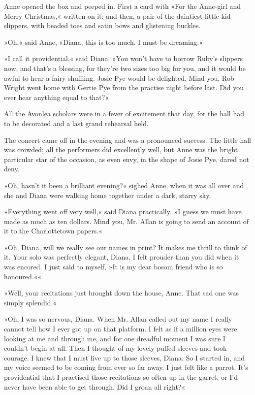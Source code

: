 Anne opened the box and peeped in. First a card with »For the Anne-girl and Merry Christmas,« written on it; and then, a pair of the daintiest little kid slippers, with beaded toes and satin bows and glistening buckles.

»Oh,« said Anne, »Diana, this is too much. I must be dreaming.«

»I call it providential,« said Diana. »You won’t have to borrow Ruby’s slippers now, and that’s a blessing, for they’re two sizes too big for you, and it would be awful to hear a fairy shuffling. Josie Pye would be delighted. Mind you, Rob Wright went home with Gertie Pye from the practise night before last. Did you ever hear anything equal to that?«

All the Avonlea scholars were in a fever of excitement that day, for the hall had to be decorated and a last grand rehearsal held.

The concert came off in the evening and was a pronounced success. The little hall was crowded; all the performers did excellently well, but Anne was the bright particular star of the occasion, as even envy, in the shape of Josie Pye, dared not deny.

»Oh, hasn’t it been a brilliant evening?« sighed Anne, when it was all over and she and Diana were walking home together under a dark, starry sky.

»Everything went off very well,« said Diana practically. »I guess we must have made as much as ten dollars. Mind you, Mr. Allan is going to send an account of it to the Charlottetown papers.«

»Oh, Diana, will we really see our names in print? It makes me thrill to think of it. Your solo was perfectly elegant, Diana. I felt prouder than you did when it was encored. I just said to myself, »It is my dear bosom friend who is so honoured.««

»Well, your recitations just brought down the house, Anne. That sad one was simply splendid.«

»Oh, I was so nervous, Diana. When Mr. Allan called out my name I really cannot tell how I ever got up on that platform. I felt as if a million eyes were looking at me and through me, and for one dreadful moment I was sure I couldn’t begin at all. Then I thought of my lovely puffed sleeves and took courage. I knew that I must live up to those sleeves, Diana. So I started in, and my voice seemed to be coming from ever so far away. I just felt like a parrot. It’s providential that I practised those recitations so often up in the garret, or I’d never have been able to get through. Did I groan all right?«

